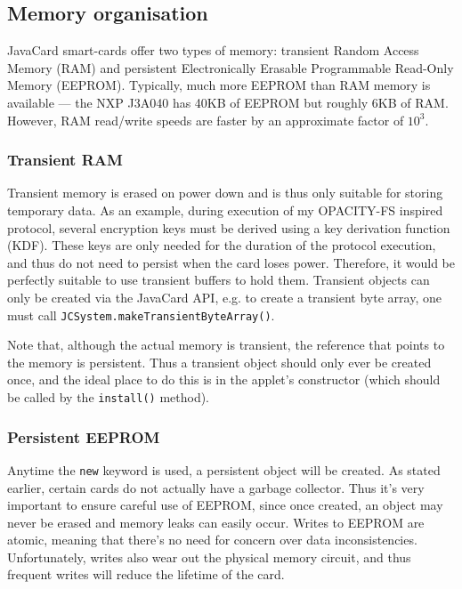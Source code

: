 \documentclass[12pt,a4paper,twoside,openright]{report}
\begin{document}
\subsection{Memory organisation} \label{javacardmemory}

JavaCard smart-cards offer two types of memory: transient Random Access Memory (RAM) and persistent Electronically Erasable Programmable Read-Only Memory (EEPROM). Typically, much more EEPROM than RAM memory is available --- the NXP J3A040 has 40KB of EEPROM but roughly 6KB of RAM. However, RAM read/write speeds are faster by an approximate factor of $10^3$.

\subsubsection{Transient RAM}

Transient memory is erased on power down and is thus only suitable for storing temporary data. As an example, during execution of my OPACITY-FS inspired protocol, several encryption keys must be derived using a key derivation function (KDF). These keys are only needed for the duration of the protocol execution, and thus do not need to persist when the card loses power. Therefore, it would be perfectly suitable to use transient buffers to hold them. Transient objects can only be created via the JavaCard API, e.g. to create a transient byte array, one must call \texttt{JCSystem.makeTransientByteArray()}.

Note that, although the actual memory is transient, the reference that points to the memory is persistent. Thus a transient object should only ever be created once, and the ideal place to do this is in the applet's constructor (which should be called by the \texttt{install()} method).

\subsubsection{Persistent EEPROM}

Anytime the \texttt{new} keyword is used, a persistent object will be created. As stated earlier, certain cards do not actually have a garbage collector. Thus it's very important to ensure careful use of EEPROM, since once created, an object may never be erased and memory leaks can easily occur. Writes to EEPROM are atomic, meaning that there's no need for concern over data inconsistencies. Unfortunately, writes also wear out the physical memory circuit, and thus frequent writes will reduce the lifetime of the card.
\end{document}
